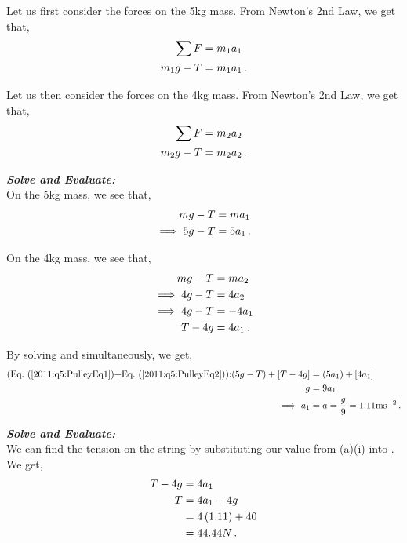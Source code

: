 \begin{subquestions}
\begin{subsubquestions}
	Let us first consider the forces on the 5kg mass. From Newton's 2nd Law, we get that,
	\begin{align}
		\sum F & = m_1a_1 \nonumber \\
		m_1g - T & = m_1a_1 \,.
	\end{align}
	
	Let us then consider the forces on the 4kg mass. From Newton's 2nd Law, we get that,
	\begin{align}
		\sum F & = m_2a_2 \nonumber \\
		m_2g-T & = m_2a_2 \,.
	\end{align}
	
	
	
	
	\textbf{\textit{Solve and Evaluate:}} \\
	On the 5kg mass, we see that,
	\begin{align}
		mg - T & = ma_1 \nonumber \\
		\implies 5g-T & = 5a_1 \,. \label{2011:q5:PulleyEq1}
	\end{align}
	
	On the 4kg mass, we see that,
	\begin{align}
		mg - T & = ma_2 \nonumber \\
		\implies 4g-T & = 4a_2 \nonumber \\
		\implies 4g-T & = -4a_1 \nonumber \\
		T-4g & = 4a_1 \,. \label{2011:q5:PulleyEq2}
	\end{align}
	
	By solving  and  simultaneously, we get,
	\begin{align}
		\text{(\req{2011:q5:PulleyEq1}+\req{2011:q5:PulleyEq2}):} (5g-T)+[T-4g] & = (5a_1)+[4a_1] \nn \\
		g & = 9a_1 \nn \\
		\implies a_1 & = a = \frac{g}{9} = 1.11\text{ms}^{-2} \,.
	\end{align}
	
	
	\subsubquestion
	
	\textbf{\textit{Solve and Evaluate:}} \\
	We can find the tension on the string by substituting our value from (a)(i) into . We get,
	\begin{align}
		T-4g & = 4a_1 \nonumber \\
		T & = 4a_1 + 4g \nonumber \\
		& = 4\left(1.11 \right) + 40 \nonumber \\
		& = 44.44N \,.
	\end{align}

\end{subsubquestions}

\end{subquestions}